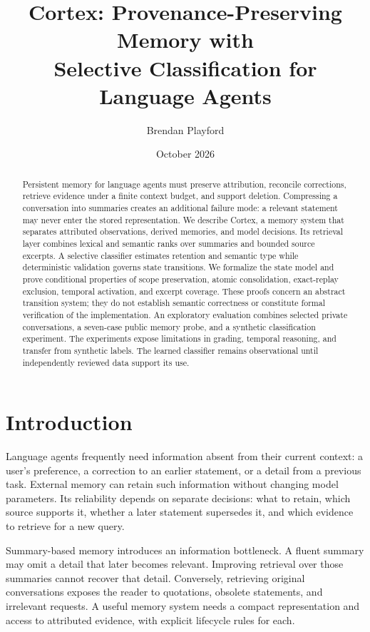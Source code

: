 \documentclass[11pt]{article}
\title{Cortex: Provenance-Preserving Memory with\\Selective Classification for Language Agents}
\author{Brendan Playford}
\date{October 2026}
\begin{document}
\maketitle
\begin{abstract}
Persistent memory for language agents must preserve attribution, reconcile corrections, retrieve evidence under a finite context budget, and support deletion. Compressing a conversation into summaries creates an additional failure mode: a relevant statement may never enter the stored representation. We describe Cortex, a memory system that separates attributed observations, derived memories, and model decisions. Its retrieval layer combines lexical and semantic ranks over summaries and bounded source excerpts. A selective classifier estimates retention and semantic type while deterministic validation governs state transitions. We formalize the state model and prove conditional properties of scope preservation, atomic consolidation, exact-replay exclusion, temporal activation, and excerpt coverage. These proofs concern an abstract transition system; they do not establish semantic correctness or constitute formal verification of the implementation. An exploratory evaluation combines selected private conversations, a seven-case public memory probe, and a synthetic classification experiment. The experiments expose limitations in grading, temporal reasoning, and transfer from synthetic labels. The learned classifier remains observational until independently reviewed data support its use.
\end{abstract}

\section{Introduction}
Language agents frequently need information absent from their current context: a user's preference, a correction to an earlier statement, or a detail from a previous task. External memory can retain such information without changing model parameters. Its reliability depends on separate decisions: what to retain, which source supports it, whether a later statement supersedes it, and which evidence to retrieve for a new query.

Summary-based memory introduces an information bottleneck. A fluent summary may omit a detail that later becomes relevant. Improving retrieval over those summaries cannot recover that detail. Conversely, retrieving original conversations exposes the reader to quotations, obsolete statements, and irrelevant requests. A useful memory system needs a compact representation and access to attributed evidence, with explicit lifecycle rules for each.
\end{document}
